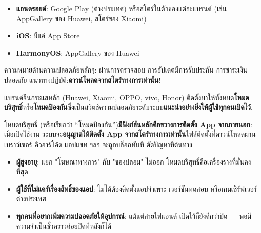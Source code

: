 


\begin{itemize}
  \item \textbf{แอนดรอยด์}: Google Play (ต่างประเทศ) หรือสโตร์ในตัวของแต่ละแบรนด์ (เช่น AppGallery ของ Huawei, สโตร์ของ Xiaomi)
  \item \textbf{iOS}: มีแค่ App Store
  \item \textbf{HarmonyOS}: AppGallery ของ Huawei
\end{itemize}

ความหมายด้านความปลอดภัยหลักๆ: ผ่านการตรวจสอบ การอัปเดตมีการรับประกัน การชำระเงินปลอดภัย แนวทางปฏิบัติ:\textbf{ดาวน์โหลดจากสโตร์ทางการเท่านั้น!}


แบรนด์จีนกระแสหลัก (Huawei, Xiaomi, OPPO, vivo, Honor) ติดตั้งมาให้ทั้งหมด\textbf{โหมดบริสุทธิ์}หรือ\textbf{โหมดป้องกัน}ซึ่งเป็นสวิตช์ความปลอดภัยระดับระบบ\textbf{แนะนำอย่างยิ่งให้ผู้ใช้ทุกคนเปิดไว้}.


โหมดบริสุทธิ์ (หรือเรียกว่า “โหมดป้องกัน”)\textbf{มีฟังก์ชันหลักคือขวางการติดตั้ง App จากภายนอก}: เมื่อเปิดใช้งาน ระบบจะ\textbf{อนุญาตให้ติดตั้ง App จากสโตร์ทางการเท่านั้น}ไฟล์ติดตั้งที่ดาวน์โหลดผ่านเบราว์เซอร์ คิวอาร์โค้ด แอปแชท ฯลฯ จะถูกบล็อกทันที ตัดปัญหาที่ต้นทาง


\begin{itemize}
  \item \textbf{ผู้สูงอายุ}: แยก "โฆษณาทางการ" กับ "ของปลอม" ไม่ออก โหมดบริสุทธิ์คือเครื่องรางที่มั่นคงที่สุด
  \item \textbf{ผู้ใช้ที่ไม่แคร์เรื่องสิทธิ์ของแอป}: ไม่ได้ต้องติดตั้งแอปจำเพาะ เวอร์ชันทดสอบ หรือเกมเซิร์ฟเวอร์ต่างประเทศ
  \item \textbf{ทุกคนที่อยากเพิ่มความปลอดภัยให้อุปกรณ์}: แม้แต่สายไฟแอนด์ เปิดไว้ก็ยังดีกว่าปิด — พอมีความจำเป็นชั่วคราวค่อยปิดทีหลังก็ได้
\end{itemize}


